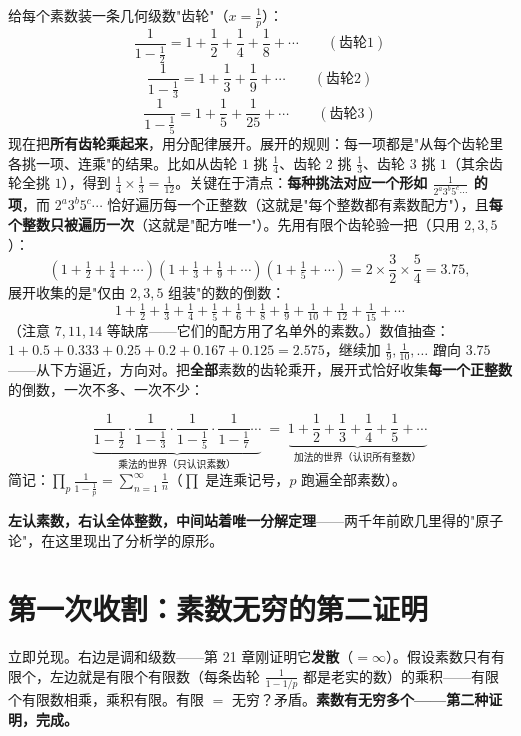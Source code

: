 给每个素数装一条几何级数"齿轮"（$x = \tfrac1p$）：
\[
\frac{1}{1-\frac12} = 1 + \frac12 + \frac14 + \frac18 + \cdots \qquad (\text{齿轮}1)
\]
\[
\frac{1}{1-\frac13} = 1 + \frac13 + \frac19 + \cdots \qquad (\text{齿轮}2)
\]
\[
\frac{1}{1-\frac15} = 1 + \frac15 + \frac1{25} + \cdots \qquad (\text{齿轮}3)
\]
现在把\textbf{所有齿轮乘起来}，用分配律展开。展开的规则：每一项都是"从每个齿轮里各挑一项、连乘"的结果。比如从齿轮 $1$ 挑 $\tfrac14$、齿轮 $2$ 挑 $\tfrac13$、齿轮 $3$ 挑 $1$（其余齿轮全挑 $1$），得到 $\tfrac14\times\tfrac13 = \tfrac1{12}$。关键在于清点：\textbf{每种挑法对应一个形如 $\tfrac{1}{2^a3^b5^c\cdots}$ 的项}，而 $2^a3^b5^c\cdots$ 恰好遍历每一个正整数（这就是"每个整数都有素数配方"），且\textbf{每个整数只被遍历一次}（这就是"配方唯一"）。先用有限个齿轮验一把（只用 $2, 3, 5$）：
\[
\left(1+\tfrac12+\tfrac14+\cdots\right)\left(1+\tfrac13+\tfrac19+\cdots\right)\left(1+\tfrac15+\cdots\right)
= 2\times\frac32\times\frac54 = 3.75,
\]
展开收集的是"仅由 $2,3,5$ 组装"的数的倒数：
\[
1 + \tfrac12 + \tfrac13 + \tfrac14 + \tfrac15 + \tfrac16 + \tfrac18 + \tfrac19 + \tfrac1{10} + \tfrac1{12} + \tfrac1{15} + \cdots
\]
（注意 $7, 11, 14$ 等缺席——它们的配方用了名单外的素数。）数值抽查：$1+0.5+0.333+0.25+0.2+0.167+0.125 = 2.575$，继续加 $\tfrac19, \tfrac1{10},\dots$ 蹭向 $3.75$——从下方逼近，方向对。把\textbf{全部}素数的齿轮乘开，展开式恰好收集\textbf{每一个正整数}的倒数，一次不多、一次不少：

\begin{dingli}[欧拉乘积公式，1737 年]
\[
\underbrace{\frac{1}{1-\frac12}\cdot\frac{1}{1-\frac13}\cdot\frac{1}{1-\frac15}\cdot\frac{1}{1-\frac17}\cdots}_{\text{乘法的世界（只认识素数）}}
\;=\;
\underbrace{1 + \frac12 + \frac13 + \frac14 + \frac15 + \cdots}_{\text{加法的世界（认识所有整数）}}
\]
简记：$\displaystyle\prod_{p}\frac{1}{1-\frac1p} = \sum_{n=1}^\infty \frac1n$（$\prod$ 是连乘记号，$p$ 跑遍全部素数）。
\end{dingli}

\textbf{左认素数，右认全体整数，中间站着唯一分解定理}——两千年前欧几里得的"原子论"，在这里现出了分析学的原形。

\section{第一次收割：素数无穷的第二证明}

立即兑现。右边是调和级数——第 21 章刚证明它\textbf{发散}（$=\infty$）。假设素数只有有限个，左边就是有限个有限数（每条齿轮 $\tfrac{1}{1-1/p}$ 都是老实的数）的乘积——有限个有限数相乘，乘积有限。有限 $=$ 无穷？矛盾。\textbf{素数有无穷多个——第二种证明，完成。}

